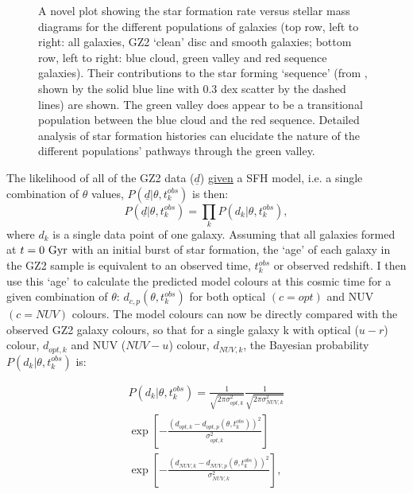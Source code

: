\documentclass{mn2e}
\begin{document}
\begin{figure}
\caption{A novel plot showing the star formation rate versus stellar mass diagrams for the different populations of galaxies  (top row, left to right: all galaxies, GZ2 `clean' disc and smooth galaxies; bottom row, left to right: blue cloud, green valley and red sequence galaxies). Their contributions to the star forming `sequence' (from \citet{Peng}, shown by the solid blue line with 0.3 dex scatter by the dashed lines) are shown. The green valley does appear to be a transitional population between the blue cloud and the red sequence. Detailed analysis of star formation histories can elucidate the nature of the different populations' pathways through the green valley.}
\label{sfr_mass_sub}
\end{figure}

The likelihood of all of the GZ2 data ($\underline{d}$) \underline{given} a SFH model, i.e. a single combination of $\theta$ values, $P(\underline{d}|\theta, t_{k}^{obs})$ is then:
\begin{equation}
P(\underline{d}|\theta, t_{k}^{obs}) = \prod_{k} P(d_{k}|\theta, t_{k}^{obs}),
\end{equation}
where $d_{k}$ is a single data point of one galaxy. Assuming that all galaxies formed at $t=0~\rm{Gyr}$ with an initial burst of star formation, the `age' of each galaxy in the GZ2 sample is equivalent to an observed time, $t^{obs}_{k}$ or observed redshift. I then use this `age' to calculate the predicted model colours at this cosmic time for a given combination of $\theta$: $d_{c,p}(\theta, t^{obs}_{k})$ for both optical $(c=opt)$ and NUV $(c=NUV)$ colours. The model colours can now be directly compared with the observed GZ2 galaxy colours, so that for a single galaxy k with optical ($u-r$) colour, $d_{opt, k}$ and NUV ($NUV-u$) colour, $d_{NUV,k}$, the Bayesian probability $P(d_{k}|\theta, t^{obs}_{k})$ is:


\begin{multline}\label{like}
P(d_{k}|\theta, t^{obs}_{k}) = \frac{1}{\sqrt{2\pi\sigma_{opt, k}^2}}\frac{1}{\sqrt{2\pi\sigma_{NUV, k}^2}} \\ \exp{\left[ - \frac{(d_{opt, k} - d_{opt, p}(\theta, t_{k}^{obs}))^2}{\sigma_{opt, k}^2} \right]} \\ \exp{\left[ - \frac{(d_{NUV, k} - d_{NUV, p}(\theta, t_{k}^{obs}))^2}{\sigma_{NUV, k}^2} \right]},
\end{multline}
\end{document}
